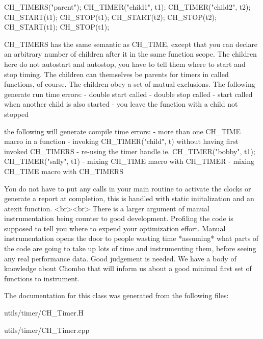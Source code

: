 \begin{DoxyCode}
CH\_TIMERS(\textcolor{stringliteral}{"parent"});
CH\_TIMER(\textcolor{stringliteral}{"child1"}, t1);
CH\_TIMER(\textcolor{stringliteral}{"child2"}, t2);
CH\_START(t1);
CH\_STOP(t1);
CH\_START(t2);
CH\_STOP(t2);
CH\_START(t1);
CH\_STOP(t1);
\end{DoxyCode}
 \begin{DoxyVerb} CH_TIMERS has the same semantic as CH_TIME, except that you can declare an
 arbitrary number of children after it in the same function scope.  The
 children here do not autostart and autostop, you have to tell them where to
 start and stop timing.  The children can themselves be parents for timers
 in called functions, of course. The children obey a set of mutual exclusions. The
 following generate run time errors:
 - double start called
 - double stop called
 - start called when another child is also started
 - you leave the function with a child not stopped

 the following will generate compile time errors:
 - more than one CH_TIME macro in a function
 - invoking CH_TIMER("child", t) without having first invoked CH_TIMERS
 - re-using the timer handle ie. CH_TIMER("bobby", t1); CH_TIMER("sally", t1)
 - mixing CH_TIME macro with CH_TIMER
 - mixing CH_TIME macro with CH_TIMERS

 You do not have to put any calls in your main routine to activate the clocks
 or generate a report at completion, this is handled with static iniitalization
 and an atexit function.
 <br><br>
 There is a larger argument of manual instrumentation being counter to good development.
 Profiling the code is supposed to tell you where to expend your optimization effort.
 Manual instrumentation opens the door to people wasting time *assuming* what parts of the
 code are going to take up lots of time and instrumenting them, before seeing any real
 performance data.  Good judgement is needed.  We have a body of knowledge about Chombo
 that will inform us about a good minimal first set of functions to instrument.\end{DoxyVerb}
 

The documentation for this class was generated from the following files\+:\begin{DoxyCompactItemize}
\item 
utils/timer/C\+H\+\_\+\+Timer.\+H\item 
utils/timer/C\+H\+\_\+\+Timer.\+cpp\end{DoxyCompactItemize}
